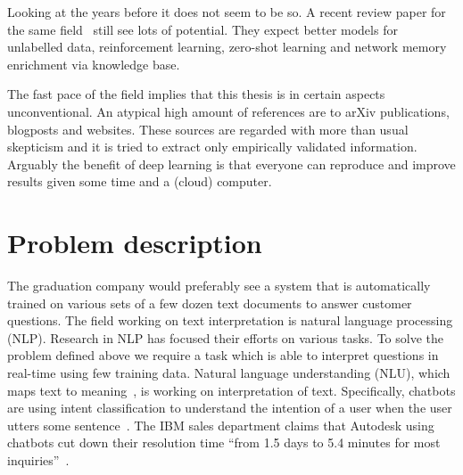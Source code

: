 Looking at the years before it does not seem to be so.
A recent review paper for the same field~\citep{young2018recent} still see lots of potential.
They expect better models for unlabelled data, reinforcement learning, zero-shot learning and network memory enrichment via knowledge base.

The fast pace of the field implies that this thesis is in certain aspects unconventional.
An atypical high amount of references are to arXiv publications, blogposts and websites.
These sources are regarded with more than usual skepticism and it is tried to extract only empirically validated information.
Arguably the benefit of deep learning is that everyone can reproduce and improve results given some time and a (cloud) computer.
\fi

\section{Problem description}
\label{sec:problem_description}
The graduation company would preferably see a system that is automatically trained on various sets of a few dozen text documents to answer customer questions.
The field working on text interpretation is natural language processing (NLP).
Research in NLP has focused their efforts on various tasks.
To solve the problem defined above we require a task which is able to interpret questions in real-time using few training data.
Natural language understanding (NLU), which maps text to meaning~\citep{jurafsky2014speech}, is working on interpretation of text.
Specifically, chatbots are using intent classification to understand the intention of a user when the user utters some sentence~\citep{bocklisch2017rasa,burtsev2018,zhou2018design}.
The IBM sales department claims that Autodesk using chatbots cut down their resolution time ``from 1.5 days to 5.4 minutes for most inquiries''~\citep{ibm2018autodesk}.

